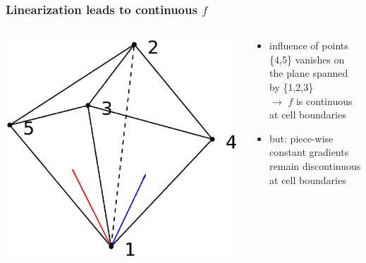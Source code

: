 \documentclass{beamer}
\begin{document}
\begin{frame}
\frametitle{Linearization leads to continuous $f$}
\vspace{-1cm}
\begin{columns}[onlytextwidth]
	\begin{column}{0.45\textwidth}
	\vspace{0.45cm}
		\begin{center}
		\includegraphics[trim={10 3 2 1.5cm},clip,width=1.1\textwidth]{FIGURES/linearization.eps}
	\end{center}
	\end{column}
	\begin{column}{0.55\textwidth}
		\begin{center}
		\begin{itemize}
			\item influence of points \{4,5\} vanishes on the plane spanned by \{1,2,3\}\\
			$\rightarrow$ $f$ is continuous at cell boundaries
			\item but: piece-wise constant gradients remain discontinuous at cell boundaries
		\end{itemize}
	\end{center}
\end{column}
\end{columns}
\end{frame}
\end{document}
